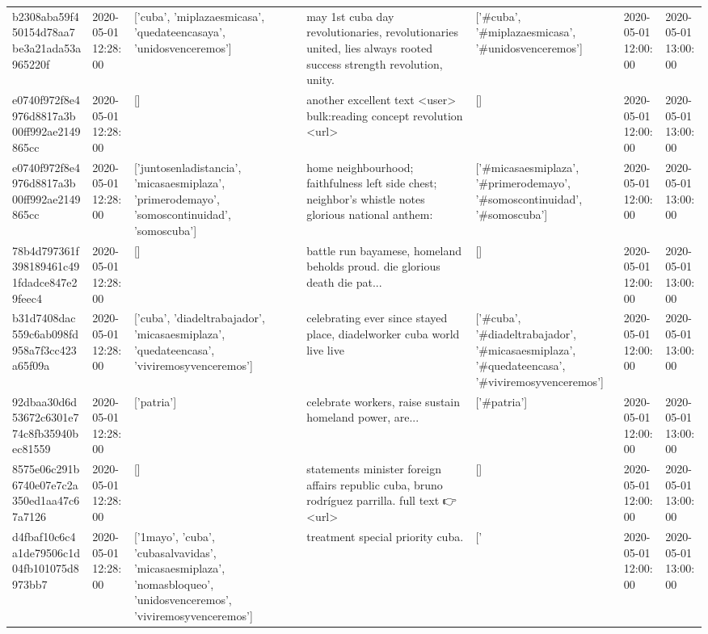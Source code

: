 \begin{tabular}{lllllll}
b2308aba59f450154d78aa7be3a21ada53a965220f & 2020-05-01 12:28:00 & ['cuba', 'miplazaesmicasa', 'quedateencasaya', 'unidosvenceremos'] & may 1st cuba day revolutionaries, revolutionaries united, lies always rooted success strength revolution, unity. & ['#cuba', '#miplazaesmicasa', '#unidosvenceremos'] & 2020-05-01 12:00:00 & 2020-05-01 13:00:00 \\
e0740f972f8e4976d8817a3b00ff992ae2149865cc & 2020-05-01 12:28:00 & [] & another excellent text <user> bulk:reading concept revolution <url> & [] & 2020-05-01 12:00:00 & 2020-05-01 13:00:00 \\
e0740f972f8e4976d8817a3b00ff992ae2149865cc & 2020-05-01 12:28:00 & ['juntosenladistancia', 'micasaesmiplaza', 'primerodemayo', 'somoscontinuidad', 'somoscuba'] & home neighbourhood; faithfulness left side chest; neighbor's whistle notes glorious national anthem: & ['#micasaesmiplaza', '#primerodemayo', '#somoscontinuidad', '#somoscuba'] & 2020-05-01 12:00:00 & 2020-05-01 13:00:00 \\
78b4d797361f398189461c491fdadce847e29feec4 & 2020-05-01 12:28:00 & [] & battle run bayamese, homeland beholds proud. die glorious death die pat... & [] & 2020-05-01 12:00:00 & 2020-05-01 13:00:00 \\
b31d7408dac559c6ab098fd958a7f3cc423a65f09a & 2020-05-01 12:28:00 & ['cuba', 'diadeltrabajador', 'micasaesmiplaza', 'quedateencasa', 'viviremosyvenceremos'] & celebrating ever since stayed place, diadelworker cuba world live live & ['#cuba', '#diadeltrabajador', '#micasaesmiplaza', '#quedateencasa', '#viviremosyvenceremos'] & 2020-05-01 12:00:00 & 2020-05-01 13:00:00 \\
92dbaa30d6d53672c6301e774c8fb35940bec81559 & 2020-05-01 12:28:00 & ['patria'] & celebrate workers, raise sustain homeland power, are... & ['#patria'] & 2020-05-01 12:00:00 & 2020-05-01 13:00:00 \\
8575e06c291b6740e07e7c2a350ed1aa47c67a7126 & 2020-05-01 12:28:00 & [] & statements minister foreign affairs republic cuba, bruno rodríguez parrilla. full text 👉 <url> & [] & 2020-05-01 12:00:00 & 2020-05-01 13:00:00 \\
d4fbaf10c6c4a1de79506c1d04fb101075d8973bb7 & 2020-05-01 12:28:00 & ['1mayo', 'cuba', 'cubasalvavidas', 'micasaesmiplaza', 'nomasbloqueo', 'unidosvenceremos', 'viviremosyvenceremos'] & treatment special priority cuba. & ['#1mayo', '#cuba', '#cubasalvavidas', '#micasaesmiplaza', '#nomasbloqueo', '#unidosvenceremos', '#viviremosyvenceremos'] & 2020-05-01 12:00:00 & 2020-05-01 13:00:00 \\

\end{tabular}
